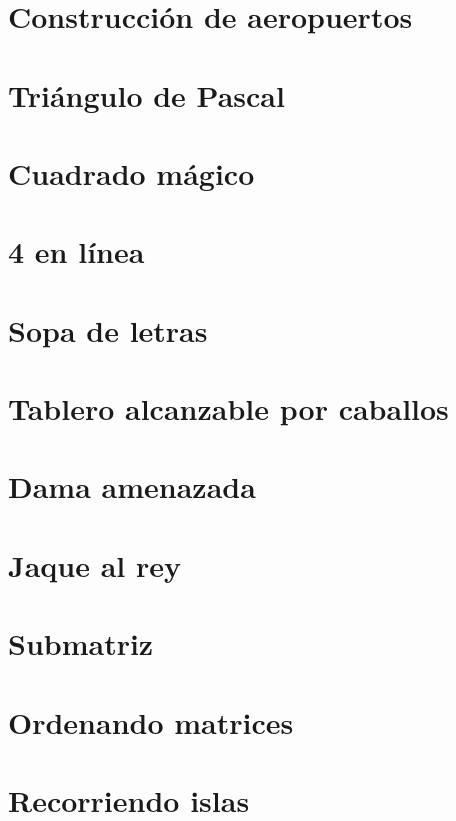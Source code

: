 \section{Construcción de aeropuertos}


\section{Triángulo de Pascal}


\section{Cuadrado mágico}


\section{4 en línea}


\section{Sopa de letras}


\section{Tablero alcanzable por caballos}


\section{Dama amenazada}


\section{Jaque al rey}


\section{Submatriz}


\section{Ordenando matrices}


\section{Recorriendo islas}

